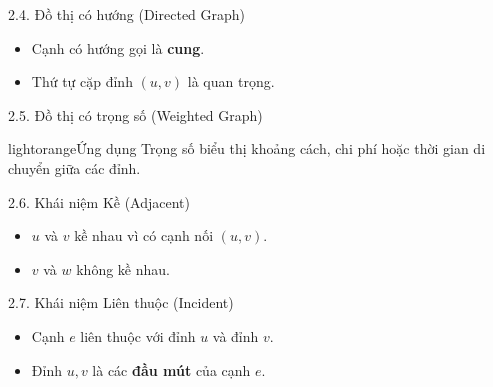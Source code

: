 \documentclass[10pt, xcolor={dvipsnames}]{beamer}
\begin{document}
\begin{frame}{2.4. Đồ thị có hướng (Directed Graph)}
    \centering
    \begin{itemize}
        \item Cạnh có hướng gọi là \textbf{cung}.
        \item Thứ tự cặp đỉnh $(u,v)$ là quan trọng.
    \end{itemize}
\end{frame}

\begin{frame}{2.5. Đồ thị có trọng số (Weighted Graph)}
    \centering
    \begin{detailbox}{lightorange}{Ứng dụng}
        Trọng số biểu thị khoảng cách, chi phí hoặc thời gian di chuyển giữa các đỉnh.
    \end{detailbox}
\end{frame}

\begin{frame}{2.6. Khái niệm Kề (Adjacent)}
    \centering
    \begin{itemize}
        \item $u$ và $v$ kề nhau vì có cạnh nối $(u,v)$.
        \item $v$ và $w$ không kề nhau.
    \end{itemize}
\end{frame}

\begin{frame}{2.7. Khái niệm Liên thuộc (Incident)}
    \centering
    \begin{itemize}
        \item Cạnh $e$ liên thuộc với đỉnh $u$ và đỉnh $v$.
        \item Đỉnh $u, v$ là các \textbf{đầu mút} của cạnh $e$.
    \end{itemize}
\end{frame}
\end{document}
